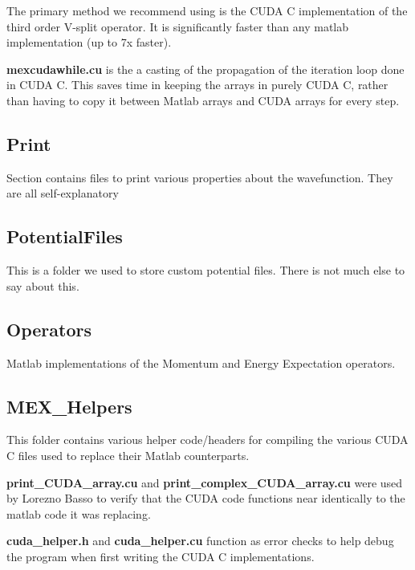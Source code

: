 \documentclass[11pt,letterpaper]{article}
\renewcommand{\\}{\bigskip}
\begin{document}
The primary method we recommend using is the CUDA C implementation of the third order V-split operator. It is significantly faster than any matlab implementation (up to 7x faster).\\

\textbf{mexcudawhile.cu} is the a casting of the propagation of the iteration loop done in CUDA C. This saves time in keeping the arrays in purely CUDA C, rather than having to copy it between Matlab arrays and CUDA arrays for every step.\\


\subsection{Print}

Section contains files to print various properties about the wavefunction. They are all self-explanatory\\

\subsection{PotentialFiles}

This is a folder we used to store custom potential files. There is not much else to say about this. 

\subsection{Operators}

Matlab implementations of the Momentum and Energy Expectation operators.\\

\subsection{MEX\_Helpers}\\

This folder contains various helper code/headers for compiling the various CUDA C files used to replace their Matlab counterparts.\\

\textbf{print\_CUDA\_array.cu} and \textbf{print\_complex\_CUDA\_array.cu} were used by Lorezno Basso to verify that the CUDA code functions near identically to the matlab code it was replacing.\\

\textbf{cuda\_helper.h} and \textbf{cuda\_helper.cu} function as error checks to help debug the program when first writing the CUDA C implementations.\\
\end{document}

